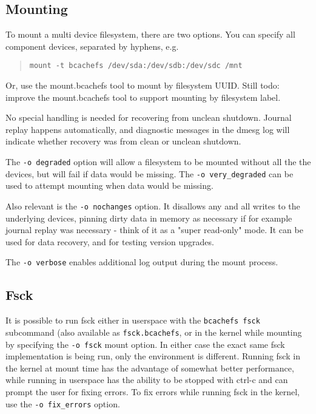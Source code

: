 \documentclass{article}
\begin{document}
\subsection{Mounting}

To mount a multi device filesystem, there are two options. You can specify all
component devices, separated by hyphens, e.g. 
\begin{quote} \begin{verbatim}
mount -t bcachefs /dev/sda:/dev/sdb:/dev/sdc /mnt
\end{verbatim} \end{quote}
Or, use the mount.bcachefs tool to mount by filesystem UUID. Still todo: improve
the mount.bcachefs tool to support mounting by filesystem label.

No special handling is needed for recovering from unclean shutdown. Journal
replay happens automatically, and diagnostic messages in the dmesg log will
indicate whether recovery was from clean or unclean shutdown.

The \texttt{-o degraded} option will allow a filesystem to be mounted without
all the the devices, but will fail if data would be missing. The
\texttt{-o very\_degraded} can be used to attempt mounting when data would be
missing.

Also relevant is the \texttt{-o nochanges} option. It disallows any and all
writes to the underlying devices, pinning dirty data in memory as necessary if
for example journal replay was necessary - think of it as a "super read-only"
mode. It can be used for data recovery, and for testing version upgrades.

The \texttt{-o verbose} enables additional log output during the mount process.

\subsection{Fsck}

It is possible to run fsck either in userspace with the \texttt{bcachefs fsck}
subcommand (also available as \texttt{fsck.bcachefs}, or in the kernel while
mounting by specifying the \texttt{-o fsck} mount option. In either case the
exact same fsck implementation is being run, only the environment is different.
Running fsck in the kernel at mount time has the advantage of somewhat better
performance, while running in userspace has the ability to be stopped with
ctrl-c and can prompt the user for fixing errors. To fix errors while running
fsck in the kernel, use the \texttt{-o fix\_errors} option.
\end{document}
